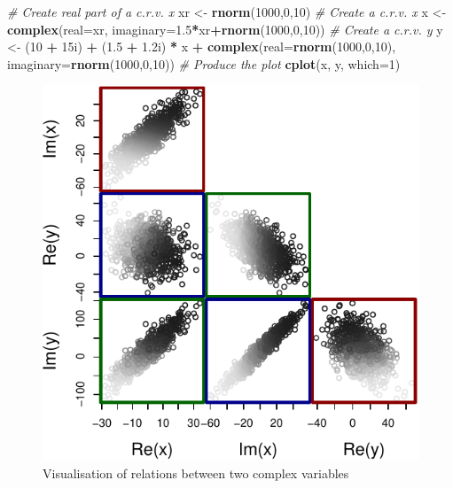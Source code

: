 \documentclass[
]{book}
\newenvironment{Shaded}{\begin{snugshade}}{\end{snugshade}}
\newcommand{\CommentTok}[1]{\textcolor[rgb]{0.56,0.35,0.01}{\textit{#1}}}
\newcommand{\DataTypeTok}[1]{\textcolor[rgb]{0.13,0.29,0.53}{#1}}
\newcommand{\DecValTok}[1]{\textcolor[rgb]{0.00,0.00,0.81}{#1}}
\newcommand{\FloatTok}[1]{\textcolor[rgb]{0.00,0.00,0.81}{#1}}
\newcommand{\KeywordTok}[1]{\textcolor[rgb]{0.13,0.29,0.53}{\textbf{#1}}}
\newcommand{\NormalTok}[1]{#1}
\newcommand{\OperatorTok}[1]{\textcolor[rgb]{0.81,0.36,0.00}{\textbf{#1}}}
\newcommand{\StringTok}[1]{\textcolor[rgb]{0.31,0.60,0.02}{#1}}
\begin{document}
\begin{Shaded}
\begin{Highlighting}[]
\CommentTok{\# Create real part of a c.r.v. x}
\NormalTok{xr \textless{}{-}}\StringTok{ }\KeywordTok{rnorm}\NormalTok{(}\DecValTok{1000}\NormalTok{,}\DecValTok{0}\NormalTok{,}\DecValTok{10}\NormalTok{)}
\CommentTok{\# Create a c.r.v. x}
\NormalTok{x \textless{}{-}}\StringTok{ }\KeywordTok{complex}\NormalTok{(}\DataTypeTok{real=}\NormalTok{xr, }\DataTypeTok{imaginary=}\FloatTok{1.5}\OperatorTok{*}\NormalTok{xr}\OperatorTok{+}\KeywordTok{rnorm}\NormalTok{(}\DecValTok{1000}\NormalTok{,}\DecValTok{0}\NormalTok{,}\DecValTok{10}\NormalTok{))}
\CommentTok{\# Create a c.r.v. y}
\NormalTok{y \textless{}{-}}\StringTok{ }\NormalTok{(}\DecValTok{10} \OperatorTok{+}\StringTok{ }\NormalTok{15i) }\OperatorTok{+}\StringTok{ }\NormalTok{(}\FloatTok{1.5} \OperatorTok{+}\StringTok{ }\FloatTok{1.2}\NormalTok{i) }\OperatorTok{*}\StringTok{ }\NormalTok{x }\OperatorTok{+}
\StringTok{    }\KeywordTok{complex}\NormalTok{(}\DataTypeTok{real=}\KeywordTok{rnorm}\NormalTok{(}\DecValTok{1000}\NormalTok{,}\DecValTok{0}\NormalTok{,}\DecValTok{10}\NormalTok{), }\DataTypeTok{imaginary=}\KeywordTok{rnorm}\NormalTok{(}\DecValTok{1000}\NormalTok{,}\DecValTok{0}\NormalTok{,}\DecValTok{10}\NormalTok{))}
\CommentTok{\# Produce the plot}
\KeywordTok{cplot}\NormalTok{(x, y, }\DataTypeTok{which=}\DecValTok{1}\NormalTok{)}
\end{Highlighting}
\end{Shaded}

\begin{figure}
\centering
\includegraphics{Svetunkov---Svetunkov---Complex-Valued-Econometrics_files/figure-latex/crvScatterplots-1.pdf}
\caption{\label{fig:crvScatterplots}Visualisation of relations between two complex variables}
\end{figure}
\end{document}
